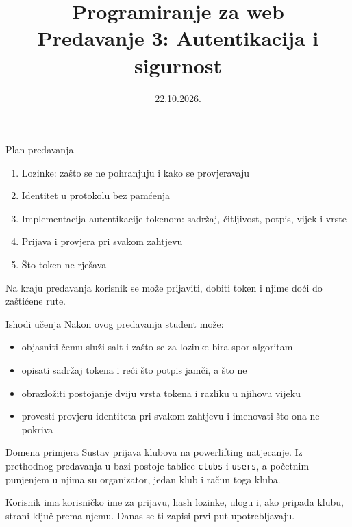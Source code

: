 

\title[Predavanje 3: Autentikacija]{Programiranje za web \\ Predavanje 3: Autentikacija i sigurnost}
\date{22.10.2026.}



\frame{\titlepage}

\begin{frame}{Plan predavanja}
\begin{enumerate}
  \item Lozinke: zašto se ne pohranjuju i kako se provjeravaju
  \item Identitet u protokolu bez pamćenja
  \item Implementacija autentikacije tokenom: sadržaj, čitljivost, potpis, vijek i vrste
  \item Prijava i provjera pri svakom zahtjevu
  \item Što token ne rješava
\end{enumerate}

\vspace{0.6em}
Na kraju predavanja korisnik se može prijaviti, dobiti token i njime doći do zaštićene rute.
\end{frame}

\begin{frame}{Ishodi učenja}
Nakon ovog predavanja student može:

\begin{itemize}

  \item objasniti čemu služi salt i zašto se za lozinke bira spor algoritam
  \item opisati sadržaj tokena i reći što potpis jamči, a što ne
  \item obrazložiti postojanje dviju vrsta tokena i razliku u njihovu vijeku
  \item provesti provjeru identiteta pri svakom zahtjevu i imenovati što ona ne pokriva
\end{itemize}
\end{frame}

\begin{frame}{Domena primjera}
Sustav prijava klubova na powerlifting natjecanje. Iz prethodnog predavanja u bazi postoje tablice \texttt{clubs} i \texttt{users}, a početnim punjenjem u njima su organizator, jedan klub i račun toga kluba.

\vspace{1.1em}
Korisnik ima korisničko ime za prijavu, hash lozinke, ulogu i, ako pripada klubu, strani ključ prema njemu. Danas se ti zapisi prvi put upotrebljavaju.
\end{frame}

